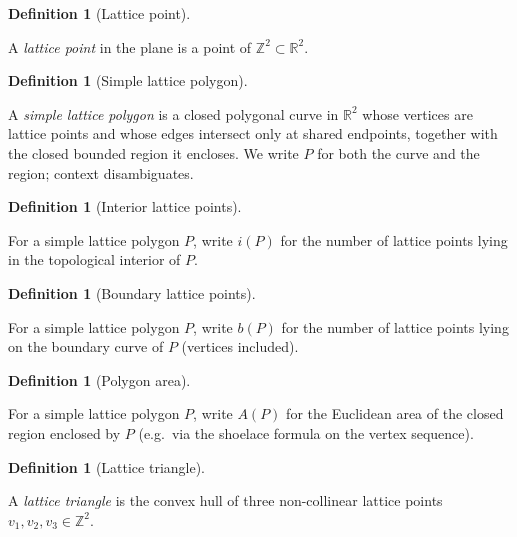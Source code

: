 \documentclass[11pt]{article}
\providecommand{\uses}[1]{}
\providecommand{\lean}[1]{}
\theoremstyle{definition}
\newtheorem{definition}[theorem]{Definition}
\begin{document}

\begin{definition}[Lattice point]
\label{def:lattice-point}
\lean{Pick.LatticePoint}
A \emph{lattice point} in the plane is a point of $\mathbb{Z}^2 \subset
\mathbb{R}^2$.
\end{definition}

\begin{definition}[Simple lattice polygon]
\label{def:simple-polygon}
\lean{Pick.SimplePolygon}
\uses{def:lattice-point}
A \emph{simple lattice polygon} is a closed polygonal curve in $\mathbb{R}^2$
whose vertices are lattice points and whose edges intersect only at shared
endpoints, together with the closed bounded region it encloses. We write $P$
for both the curve and the region; context disambiguates.
\end{definition}

\begin{definition}[Interior lattice points]
\label{def:interior-points}
\lean{Pick.SimplePolygon.interiorLatticePoints}
\uses{def:simple-polygon}
For a simple lattice polygon $P$, write $i(P)$ for the number of lattice
points lying in the topological interior of $P$.
\end{definition}

\begin{definition}[Boundary lattice points]
\label{def:boundary-points}
\lean{Pick.SimplePolygon.boundaryLatticePoints}
\uses{def:simple-polygon}
For a simple lattice polygon $P$, write $b(P)$ for the number of lattice
points lying on the boundary curve of $P$ (vertices included).
\end{definition}

\begin{definition}[Polygon area]
\label{def:area}
\lean{Pick.SimplePolygon.area}
\uses{def:simple-polygon}
For a simple lattice polygon $P$, write $A(P)$ for the Euclidean area of the
closed region enclosed by $P$ (e.g.\ via the shoelace formula on the vertex
sequence).
\end{definition}

\begin{definition}[Lattice triangle]
\label{def:lattice-triangle}
\lean{Pick.LatticeTriangle}
\uses{def:lattice-point}
A \emph{lattice triangle} is the convex hull of three non-collinear lattice
points $v_1, v_2, v_3 \in \mathbb{Z}^2$.
\end{definition}
\end{document}
